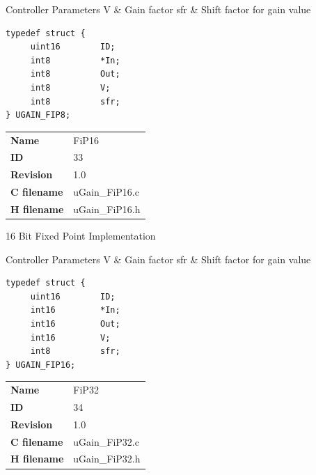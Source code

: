 \begin{XtoCtabular}{Controller Parameters}
V & Gain factor\tabularnewline
\hline
sfr & Shift factor for gain value\tabularnewline
\hline
\end{XtoCtabular}

\begin{lstlisting}
typedef struct {
     uint16        ID;
     int8          *In;
     int8          Out;
     int8          V;
     int8          sfr;
} UGAIN_FIP8;
\end{lstlisting}

\ifdefined \AddTestReports
{}
\fi
{}
\nopagebreak[0]
\begin{tabular}{l l}
\textbf{Name} & FiP16 \tabularnewline
\textbf{ID} & 33 \tabularnewline
\textbf{Revision} & 1.0 \tabularnewline
\textbf{C filename} & uGain\_FiP16.c \tabularnewline
\textbf{H filename} & uGain\_FiP16.h \tabularnewline
\end{tabular}
\vspace{1ex}

16 Bit Fixed Point Implementation

\begin{XtoCtabular}{Controller Parameters}
V & Gain factor\tabularnewline
\hline
sfr & Shift factor for gain value\tabularnewline
\hline
\end{XtoCtabular}

\begin{lstlisting}
typedef struct {
     uint16        ID;
     int16         *In;
     int16         Out;
     int16         V;
     int8          sfr;
} UGAIN_FIP16;
\end{lstlisting}

\ifdefined \AddTestReports
{}
\fi
{}
\nopagebreak[0]
\begin{tabular}{l l}
\textbf{Name} & FiP32 \tabularnewline
\textbf{ID} & 34 \tabularnewline
\textbf{Revision} & 1.0 \tabularnewline
\textbf{C filename} & uGain\_FiP32.c \tabularnewline
\textbf{H filename} & uGain\_FiP32.h \tabularnewline
\end{tabular}
\vspace{1ex}

